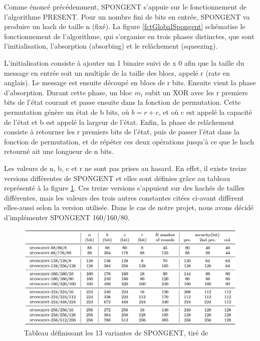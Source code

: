 				Comme énoncé précédemment, SPONGENT s’appuie sur le fonctionnement de
			l’algorithme PRESENT. Pour un nombre fini de bits en entrée, SPONGENT va
			produire un hach de taille n (fixé). La figure \ref{fctGlobalSpongent}
			schématise le fonctionnement de l’algorithme, qui s’organise en trois
			phases distinctes, que sont l’initialisation, l’absorption (absorbing) et
			le relâchement (squeezing).

			 	L’initialisation consiste à ajouter un 1 binaire suivi de x 0 afin que la
			taille du message en entrée soit un multiple de la taille des blocs, appelé
			r (rate en anglais). Le message est ensuite découpé en blocs de r bits.
			Ensuite vient la phase d’absorption. Durant cette phase, un bloc $m_{i}$
			subit un XOR avec les r premiers bits de l’état courant et passe ensuite
			dans la fonction de permutation. Cette permutation génère un état de b
			bits, où $b = r + c$, et où c est appelé la capacité de l’état et b est
			appelé la largeur de l’état. Enfin, la phase de relâchement consiste à
			retourner les r premiers bits de l’état, puis de passer l’état dans la
			fonction de permutation, et de répéter ces deux opérations jusqu’à ce que
			le hach retourné ait une longueur de n bits.

				Les valeurs de n, b, c et r ne sont pas prises au hasard. En effet, il
			existe treize versions différentes de SPONGENT et elles sont définies grâce
			au tableau représenté à la figure \ref{variantesSpongent}. Ces treize
			versions s’appuient sur des hachés de tailles différentes, mais les valeurs
			des trois autres constantes citées ci-avant diffèrent elles-aussi selon la
			version utilisée. Dans le cas de notre projet, nous avons décidé
			d’implémenter SPONGENT 160/160/80.

			\begin{figure}[!h]
				\centering
				\includegraphics[width=\textwidth]{imgs/Spongent/varianteSpongent.png}
				\caption{Tableau définissant  les 13 variantes de SPONGENT, tiré de \cite{6275435}}
				\label{variantesSpongent}
	 		\end{figure}

